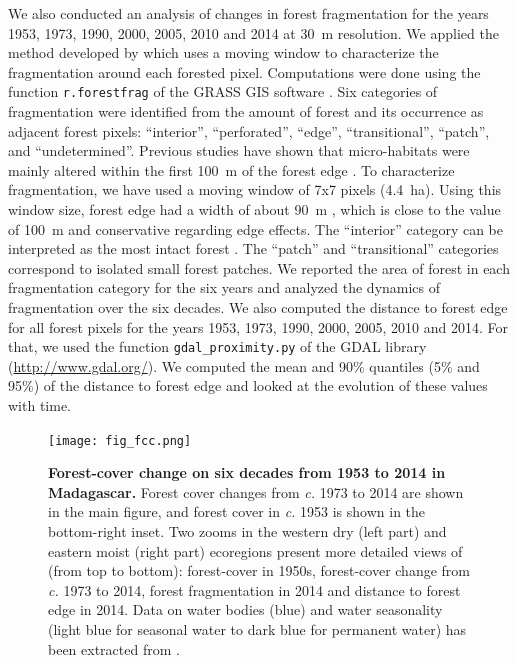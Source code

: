 \documentclass[essd, classical]{copernicus}
\begin{document}
We also conducted an analysis of changes in forest fragmentation for
the years 1953, 1973, 1990, 2000, 2005, 2010 and 2014 at 30~m
resolution. We applied the method developed by \citet{Riitters2000}
which uses a moving window to characterize the fragmentation around
each forested pixel. Computations were done using the function
\texttt{r.forestfrag} of the GRASS GIS software
\citep{Neteler2008}. Six categories of fragmentation were identified
from the amount of forest and its occurrence as adjacent forest
pixels: ``interior'', ``perforated'', ``edge'', ``transitional'',
``patch'', and ``undetermined''. Previous studies have shown that
micro-habitats were mainly altered within the first 100~m of the
forest edge \citep{Brinck2017, Gibson2013, Murcia1995,
  Broadbent2008}. To characterize fragmentation, we have used a moving
window of 7x7 pixels (4.4~ha). Using this window size, forest edge had
a width of about 90~m \citep{Riitters2000}, which is close to the
value of 100~m and conservative regarding edge effects. The
``interior'' category can be interpreted as the most intact forest
\citep{Potapov2017}. The ``patch'' and ``transitional'' categories
correspond to isolated small forest patches. We reported the area of
forest in each fragmentation category for the six years and analyzed
the dynamics of fragmentation over the six decades. We also computed
the distance to forest edge for all forest pixels for the years 1953,
1973, 1990, 2000, 2005, 2010 and 2014. For that, we used the function
\texttt{gdal\_proximity.py} of the GDAL library
(\url{http://www.gdal.org/}). We computed the mean and 90\% quantiles
(5\% and 95\%) of the distance to forest edge and looked at the
evolution of these values with time.

\begin{figure}[h]
  \centering
  
  \texttt{[image: fig\_fcc.png]}
  
  \caption{\textbf{Forest-cover change on six decades from 1953
      to 2014 in Madagascar.} Forest cover changes from \emph{c.} 1973 to 2014
    are shown in the main figure, and forest cover in \emph{c.} 1953 is
    shown in the bottom-right inset. Two zooms in the western dry (left
    part) and eastern moist (right part) ecoregions present more detailed
    views of (from top to bottom): forest-cover in 1950s, forest-cover
    change from \emph{c.} 1973 to 2014, forest fragmentation in 2014 and
    distance to forest edge in 2014. Data on water bodies (blue) and water
    seasonality (light blue for seasonal water to dark blue for permanent
    water) has been extracted from \citet{Pekel2016}.}

  \label{fig:fcc}

\end{figure}
\end{document}
